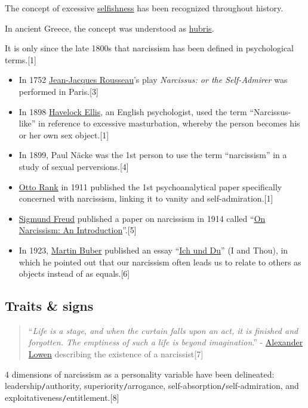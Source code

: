 \documentclass[oneside]{book}
\numberwithin{equation}{section}
\begin{document}
The concept of excessive \href{https://en.wikipedia.org/wiki/Selfishness}{selfishness} has been recognized throughout history.

In ancient Greece, the concept was understood as \href{https://en.wikipedia.org/wiki/Hubris}{hubris}.

It is only since the late 1800s that narcissism has been defined in psychological terms.[1]
\begin{itemize}
    \item In 1752 \href{https://en.wikipedia.org/wiki/Jean-Jacques_Rousseau}{Jean-Jacques Rousseau}'s play \textit{Narcissus: or the Self-Admirer} was performed in Paris.[3]
    \item In 1898 \href{https://en.wikipedia.org/wiki/Havelock_Ellis}{Havelock Ellis}, an English psychologist, used the term ``Narcissus-like'' in reference to excessive masturbation, whereby the person becomes his or her own sex object.[1]
    \item In 1899, Paul Näcke was the 1st person to use the term ``narcissism'' in a study of sexual perversions.[4]
    \item \href{https://en.wikipedia.org/wiki/Otto_Rank}{Otto Rank} in 1911 published the 1st psychoanalytical paper specifically concerned with narcissism, linking it to vanity and self-admiration.[1]
    \item \href{https://en.wikipedia.org/wiki/Sigmund_Freud}{Sigmund Freud} published a paper on narcissism in 1914 called ``\href{https://en.wikipedia.org/wiki/On_Narcissism}{On Narcissism: An Introduction}''.[5]
    \item In 1923, \href{https://en.wikipedia.org/wiki/Martin_Buber}{Martin Buber} published an essay ``\href{https://en.wikipedia.org/wiki/Ich_und_Du}{Ich und Du}'' (I and Thou), in which he pointed out that our narcissism often leads us to relate to others as objects instead of as equals.[6]
\end{itemize}

\subsection{Traits \& signs}
\begin{quotation}
    ``\textit{Life is a stage, and when the curtain falls upon an act, it is finished and forgotten. The emptiness of such a life is beyond imagination}.'' - \href{https://en.wikipedia.org/wiki/Alexander\_Lowen}{Alexander Lowen} describing the existence of a narcissist[7]
\end{quotation}
4 dimensions of narcissism as a personality variable have been delineated: leadership\texttt{/}authority, superiority\texttt{/}arrogance, self-absorption\texttt{/}self-admiration, and exploitativeness\texttt{/}entitlement.[8]
\end{document}
